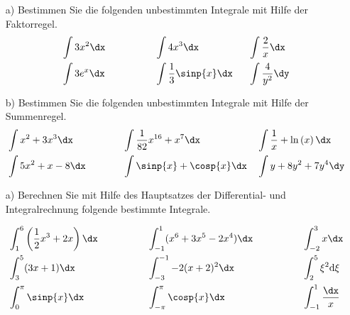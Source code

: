 \begin{itemize}
	\item[a)] Bestimmen Sie die folgenden unbestimmten Integrale mit Hilfe der Faktorregel.
	\begin{alignat*}{3}
		& \int 3x^2 \dx \qquad \qquad && \int 4 x^3 \dx \qquad \qquad	&& \int \frac{2}{x} \dx \\
		& \int 3 e^x \dx && \int \frac{1}{3} \sinp{x} \dx && \int \frac{4}{y^2} \dy
	\end{alignat*}
	\item[b)] Bestimmen Sie die folgenden unbestimmten Integrale mit Hilfe der Summenregel.
	\begin{alignat*}{3}
		& \int x^2 + 3 x^3 \dx \qquad \qquad && \int \frac{1}{82} x^{16} + x^7 \dx \qquad \qquad && \int \frac{1}{x} + \ln \left(x\right) \dx\\
		& \int 5 x^2 + x - 8 \dx && \int \sinp{x} + \cosp{x} \dx && \int y + 8y^2 + 7 y^4 \dy\\
	\end{alignat*}
\end{itemize}
\begin{itemize}
	\item[a)] Berechnen Sie mit Hilfe des Hauptsatzes der Differential- und Integralrechnung folgende bestimmte Integrale.
	
	\centering
	
	\begin{alignat*}{3}
		& \int_{1}^{6} \left(\frac{1}{2} x^3 + 2x\right) \dx \qquad \qquad && \int_{-1}^{1} (x^6 + 3x^5 - 2x^4) \dx  \qquad \qquad && \int_{-2}^{3} x \dx\\
		& \int_{3}^{5} (3x+1) \dx && \int_{-3}^{-1} -2(x+2)^2 \dx && \int_{2}^{5} \xi^2 \mathrm{d \xi}\\
		& \int_{0}^{\pi} \sinp{x} \dx && \int_{-\pi}^{\pi} \cosp{x} \dx && \int_{-1}^{1} \frac{\dx}{x}
	\end{alignat*}
\end{itemize}

